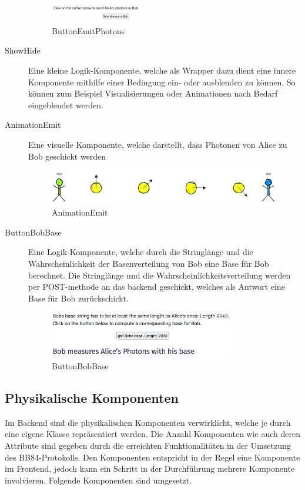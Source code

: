 \documentclass[a4paper,10.2pt,pdftex]{scrartcl}%
\begin{document}
\begin{description}
\begin{figure}[h]
	\centering
  \includegraphics[width=0.4\textwidth]{graphics/component_button_emit_photons.png}
	\caption{ButtonEmitPhotons}
\end{figure}
\item[ShowHide] Eine kleine Logik-Komponente, welche als Wrapper dazu dient eine innere Komponente mithilfe einer Bedingung ein- oder ausblenden zu können. So können zum Beispiel Visualisierungen oder Animationen nach Bedarf eingeblendet werden.
\item[AnimationEmit] Eine visuelle Komponente, welche darstellt, dass Photonen von Alice zu Bob geschickt werden
\begin{figure}[h]
	\centering
  \includegraphics[width=\textwidth]{graphics/component_animation_emit.png}
	\caption{AnimationEmit}
\end{figure}
\item[ButtonBobBase] Eine Logik-Komponente, welche durch die Stringlänge und die Wahrscheinlichkeit der Basenverteilung von Bob eine Base für Bob berechnet. Die Stringlänge und die Wahrscheinlichkeitsverteilung werden per POST-methode an das backend geschickt, welches als Antwort eine Base für Bob zurückschickt. 
\begin{figure}[h]
	\centering
  \includegraphics[width=0.8\textwidth]{graphics/component_button_bob_base.png}
	\caption{ButtonBobBase}
\end{figure}
\end{description}


\subsection{Physikalische Komponenten}
Im Backend sind die physikalischen Komponenten verwirklicht, welche je durch eine eigene Klasse repräsentiert werden. Die Anzahl Komponenten wie auch deren Attribute sind gegeben durch die erreichten Funktionalitäten in der Umsetzung des BB84-Protokolls. Den Komponenten entspricht in der Regel eine Komponente im Frontend, jedoch kann ein Schritt in der Durchführung mehrere Komponente involvieren. Folgende Komponenten sind umgesetzt. 
\end{document}
